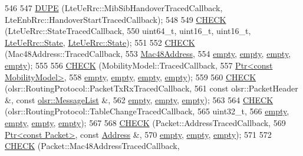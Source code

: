 \begin{DoxyCode}
546 
547   \hyperlink{traced-callback-typedef-test-suite_8cc_a50f6941ad15ebf54b093e7a2faf9a3f9}{DUPE}   (LteUeRrc::MibSibHandoverTracedCallback, LteEnbRrc::HandoverStartTracedCallback);
548 
549   \hyperlink{traced-callback-typedef-test-suite_8cc_aa79806eee113005f96d9d3cb1480ce98}{CHECK} (LteUeRrc::StateTracedCallback,
550          uint64\_t, uint16\_t, uint16\_t, \hyperlink{classns3_1_1LteUeRrc_a241012c291e75681150c9214e11f6145}{LteUeRrc::State}, 
      \hyperlink{classns3_1_1LteUeRrc_a241012c291e75681150c9214e11f6145}{LteUeRrc::State});
551 
552   \hyperlink{traced-callback-typedef-test-suite_8cc_aa79806eee113005f96d9d3cb1480ce98}{CHECK} (Mac48Address::TracedCallback,
553          \hyperlink{classns3_1_1Mac48Address}{Mac48Address},
554          \hyperlink{classns3_1_1empty}{empty}, \hyperlink{classns3_1_1empty}{empty}, \hyperlink{classns3_1_1empty}{empty}, \hyperlink{classns3_1_1empty}{empty});
555 
556   \hyperlink{traced-callback-typedef-test-suite_8cc_aa79806eee113005f96d9d3cb1480ce98}{CHECK} (MobilityModel::TracedCallback,
557          \hyperlink{classns3_1_1Ptr}{Ptr<const MobilityModel>},
558          \hyperlink{classns3_1_1empty}{empty}, \hyperlink{classns3_1_1empty}{empty}, \hyperlink{classns3_1_1empty}{empty}, \hyperlink{classns3_1_1empty}{empty});
559 
560   \hyperlink{traced-callback-typedef-test-suite_8cc_aa79806eee113005f96d9d3cb1480ce98}{CHECK} (olsr::RoutingProtocol::PacketTxRxTracedCallback,
561          \textcolor{keyword}{const} olsr::PacketHeader &, \textcolor{keyword}{const} \hyperlink{namespacens3_1_1olsr_af17c710718a5637d01f37804a0a53e78}{olsr::MessageList} &,
562          \hyperlink{classns3_1_1empty}{empty}, \hyperlink{classns3_1_1empty}{empty}, \hyperlink{classns3_1_1empty}{empty});
563 
564   \hyperlink{traced-callback-typedef-test-suite_8cc_aa79806eee113005f96d9d3cb1480ce98}{CHECK} (olsr::RoutingProtocol::TableChangeTracedCallback,
565          uint32\_t,
566          \hyperlink{classns3_1_1empty}{empty}, \hyperlink{classns3_1_1empty}{empty}, \hyperlink{classns3_1_1empty}{empty}, \hyperlink{classns3_1_1empty}{empty});
567 
568   \hyperlink{traced-callback-typedef-test-suite_8cc_aa79806eee113005f96d9d3cb1480ce98}{CHECK} (Packet::AddressTracedCallback,
569          \hyperlink{classns3_1_1Ptr}{Ptr<const Packet>}, \textcolor{keyword}{const} \hyperlink{classns3_1_1Address}{Address} &,
570          \hyperlink{classns3_1_1empty}{empty}, \hyperlink{classns3_1_1empty}{empty}, \hyperlink{classns3_1_1empty}{empty});
571 
572   \hyperlink{traced-callback-typedef-test-suite_8cc_aa79806eee113005f96d9d3cb1480ce98}{CHECK} (Packet::Mac48AddressTracedCallback,

\end{DoxyCode}
